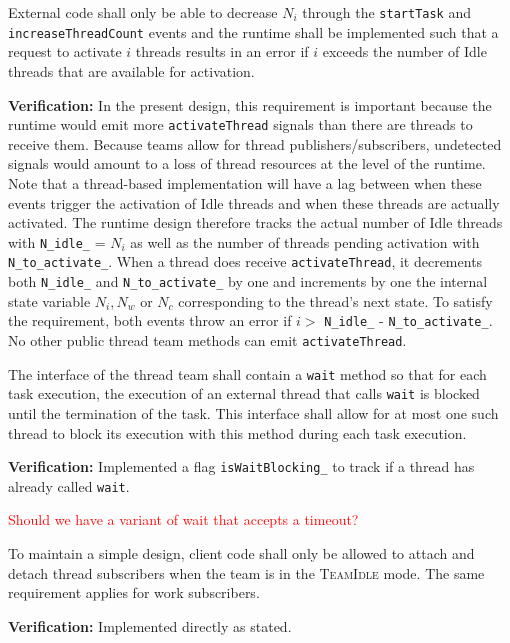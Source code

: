 \documentclass{article}
\newcommand{\TeamIdle}          {\textsc{TeamIdle}}
\begin{document}
\begin{spec}
External code shall only be able to decrease $N_i$ through the
\texttt{startTask} and \texttt{increaseThreadCount} events and the runtime shall
be implemented such that a request to activate $i$ threads results in an error
if $i$ exceeds the number of Idle threads that are available for activation.
\end{spec}
\textbf{Verification:}\hspace{0.125in}  In the present design, this requirement
is important because the runtime would emit more \texttt{activateThread} signals
than there are threads to receive them.  Because teams allow for thread
publishers/subscribers, undetected signals would amount to a loss of thread
resources at the level of the runtime.  Note that a thread-based implementation
will have a lag between when these events trigger the activation of Idle threads
and when these threads are actually activated.  The runtime design therefore
tracks the actual number of Idle threads with \texttt{N\_idle\_} = $N_i$ as well
as the number of threads pending activation with \texttt{N\_to\_activate\_}.
When a thread does receive \texttt{activateThread}, it decrements both
\texttt{N\_idle\_} and \texttt{N\_to\_activate\_} by one and increments by one
the internal state variable $N_i, N_w$ or $N_c$ corresponding to the thread's
next state.  To satisfy the requirement, both events throw an error if $i > $
\texttt{N\_idle\_} - \texttt{N\_to\_activate\_}.  No other public thread team
methods can emit \texttt{activateThread}.

\begin{spec}
\label{spec:Runtime_OneWait}
The interface of the thread team shall contain a \texttt{wait} method so that
for each task execution, the execution of an external thread that calls
\texttt{wait} is blocked until the termination of the task.  This interface
shall allow for at most one such thread to block its execution with this method
during each task execution.
\end{spec}
\textbf{Verification:}\hspace{0.125in}  Implemented a flag
\texttt{isWaitBlocking\_} to track if a thread has already called \texttt{wait}.

\textcolor{red}{Should we have a variant of wait that accepts a timeout?}

\begin{spec}
To maintain a simple design, client code shall only be allowed to attach and
detach thread subscribers when the team is in the {\TeamIdle} mode.  The same
requirement applies for work subscribers.
\end{spec}
\textbf{Verification:}\hspace{0.125in} Implemented directly as stated.
\end{document}
